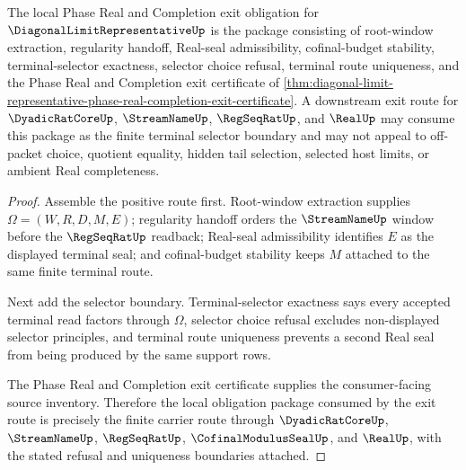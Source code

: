\begin{theorem}
\label{thm:diagonal-limit-representative-phase-real-exit-obligation-package}
The local Phase Real and Completion exit obligation for $\DiagonalLimitRepresentativeUp$ is the package consisting of root-window extraction, regularity handoff, Real-seal admissibility, cofinal-budget stability, terminal-selector exactness, selector choice refusal, terminal route uniqueness, and the Phase Real and Completion exit certificate of \autoref{thm:diagonal-limit-representative-phase-real-completion-exit-certificate}. A downstream exit route for $\DyadicRatCoreUp$, $\StreamNameUp$, $\RegSeqRatUp$, and $\RealUp$ may consume this package as the finite terminal selector boundary and may not appeal to off-packet choice, quotient equality, hidden tail selection, selected host limits, or ambient Real completeness.
\end{theorem}
\begin{proof}
Assemble the positive route first. Root-window extraction supplies $\Omega=(W,R,D,M,E)$; regularity handoff orders the $\StreamNameUp$ window before the $\RegSeqRatUp$ readback; Real-seal admissibility identifies $E$ as the displayed terminal seal; and cofinal-budget stability keeps $M$ attached to the same finite terminal route.

Next add the selector boundary. Terminal-selector exactness says every accepted terminal read factors through $\Omega$, selector choice refusal excludes non-displayed selector principles, and terminal route uniqueness prevents a second Real seal from being produced by the same support rows.

The Phase Real and Completion exit certificate supplies the consumer-facing source inventory. Therefore the local obligation package consumed by the exit route is precisely the finite carrier route through $\DyadicRatCoreUp$, $\StreamNameUp$, $\RegSeqRatUp$, $\CofinalModulusSealUp$, and $\RealUp$, with the stated refusal and uniqueness boundaries attached.
\end{proof}
